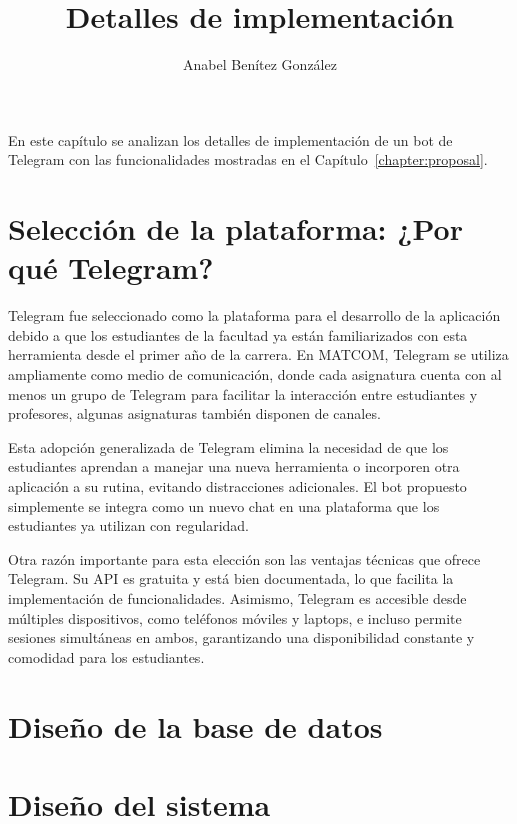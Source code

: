\documentclass{article}
\title{Detalles de implementación}
\author{Anabel Benítez González}
\date{}
\begin{document}
\maketitle

En este capítulo se analizan los detalles de implementación de un bot de Telegram con las funcionalidades mostradas en el Capítulo~\ref{chapter:proposal}.

\section{Selección de la plataforma: ¿Por qué Telegram?}

Telegram fue seleccionado como la plataforma para el desarrollo de la aplicación debido a que los estudiantes de la facultad ya están familiarizados con esta herramienta desde el primer año de la carrera. En \mbox{MATCOM}, Telegram se utiliza ampliamente como medio de comunicación, donde cada asignatura cuenta con al menos un grupo de Telegram para facilitar la interacción entre estudiantes y profesores, algunas asignaturas también disponen de canales. 

Esta adopción generalizada de Telegram elimina la necesidad de que los estudiantes aprendan a manejar una nueva herramienta o incorporen otra aplicación a su rutina, evitando distracciones adicionales. El bot propuesto simplemente se integra como un nuevo chat en una plataforma que los estudiantes ya utilizan con regularidad.

Otra razón importante para esta elección son las ventajas técnicas que ofrece Telegram. Su API es gratuita y está bien documentada, lo que facilita la implementación de funcionalidades. Asimismo, Telegram es accesible desde múltiples dispositivos, como teléfonos móviles y laptops, e incluso permite sesiones simultáneas en ambos, garantizando una disponibilidad constante y comodidad para los estudiantes.

\section{Diseño de la base de datos}

\section{Diseño del sistema}
\end{document}
